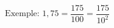 \documentclass[preview]{standalone}
\begin{document}
\begin{align*}
\text{Exemple: } 1,75   = \dfrac{175}{100} = \dfrac{175}{10^2}
\end{align*}
\end{document}
